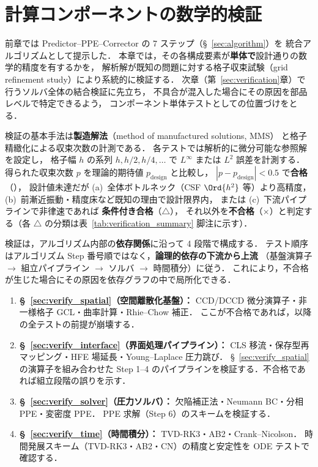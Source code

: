 %
\section{計算コンポーネントの数学的検証}
\label{sec:numerical_integrity}%
\label{sec:impl_collocate}%

前章では Predictor--PPE--Corrector の 7 ステップ（§~\ref{sec:algorithm}）を
統合アルゴリズムとして提示した．
本章では，その各構成要素が\textbf{単体で}設計通りの数学的精度を有するかを，
解析解が既知の問題に対する格子収束試験（grid refinement study）により系統的に検証する．
次章（第~\ref{sec:verification}章）で行うソルバ全体の結合検証に先立ち，
不具合が混入した場合にその原因を部品レベルで特定できるよう，
コンポーネント単体テストとしての位置づけをとる．

検証の基本手法は\textbf{製造解法}（method of manufactured solutions, MMS）
と格子精緻化による収束次数の計測である．
各テストでは解析的に微分可能な参照解を設定し，
格子幅 $h$ の系列 $h, h/2, h/4, \ldots$ で $L^\infty$ または $L^2$ 誤差を計測する．
得られた収束次数 $p$ を理論的期待値 $p_{\mathrm{design}}$ と比較し，
$|p - p_{\mathrm{design}}| < 0.5$ で\textbf{合格}（\checkmark），
設計値未達だが (a)~全体ボトルネック（CSF $\Ord{h^2}$ 等）より高精度，
(b)~前漸近振動・精度床など既知の理由で設計限界内，
または (c)~下流パイプラインで非律速であれば
\textbf{条件付き合格}（$\triangle$），
それ以外を\textbf{不合格}（$\times$）と判定する（各 $\triangle$ の分類は表~\ref{tab:verification_summary} 脚注に示す）．

検証は，アルゴリズム内部の\textbf{依存関係}に沿って 4 段階で構成する．
テスト順序はアルゴリズム Step 番号順ではなく，\textbf{論理的依存の下流から上流}
（基盤演算子 $\to$ 組立パイプライン $\to$ ソルバ $\to$ 時間積分）に従う．
これにより，不合格が生じた場合にその原因を依存グラフの中で局所化できる．
\begin{enumerate}
  \item \textbf{§~\ref{sec:verify_spatial}（空間離散化基盤）：}
        CCD/DCCD 微分演算子・非一様格子 GCL・曲率計算・Rhie--Chow 補正．
        ここが不合格であれば，以降の全テストの前提が崩壊する．
  \item \textbf{§~\ref{sec:verify_interface}（界面処理パイプライン）：}
        CLS 移流・保存型再マッピング・HFE 場延長・Young--Laplace 圧力跳び．
        §~\ref{sec:verify_spatial} の演算子を組み合わせた
        Step 1--4 のパイプラインを検証する．不合格であれば組立段階の誤りを示す．
  \item \textbf{§~\ref{sec:verify_solver}（圧力ソルバ）：}
        欠陥補正法・Neumann BC・分相 PPE・変密度 PPE．
        PPE 求解（Step 6）のスキームを検証する．
  \item \textbf{§~\ref{sec:verify_time}（時間積分）：}
        TVD-RK3・AB2・Crank--Nicolson．
        時間発展スキーム（TVD-RK3・AB2・CN）の精度と安定性を ODE テストで確認する．
\end{enumerate}

